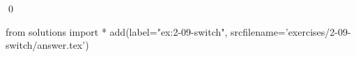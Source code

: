
\begin{ex}
  \label{ex:2-09-switch}
  
  \qed
\end{ex}
\begin{python0}
from solutions import *
add(label="ex:2-09-switch",
    srcfilename='exercises/2-09-switch/answer.tex')
\end{python0}
